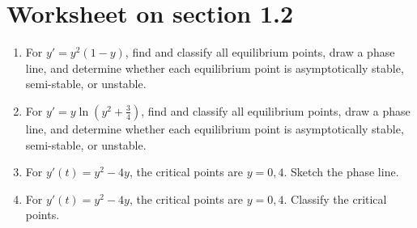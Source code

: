 \documentclass[14pt]{article}
\begin{document}
\section{Worksheet on section 1.2}
\begin{enumerate}
\item For $ y'=y^2(1-y)$, find and classify all equilibrium points, draw a phase line, and determine whether each equilibrium point is asymptotically stable, semi-stable, or unstable.
\item For $ y'=y\ln\left(y^2+\frac34\right)$, find and classify all equilibrium points, draw a phase line, and determine whether each equilibrium point is asymptotically stable, semi-stable, or unstable.
\item For $y'(t)=y^2-4y$, the critical points are $y=0,4$. Sketch the phase line.  
\item For $y'(t)=y^2-4y$, the critical points are $y=0,4$. Classify the critical points. 
\end{enumerate}
\end{document}
